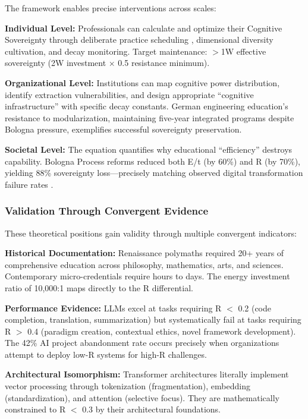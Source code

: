 The framework enables precise interventions across scales:

\textbf{Individual Level:} Professionals can calculate and optimize their Cognitive Sovereignty through deliberate practice scheduling \citep{ericsson1993}, dimensional diversity cultivation, and decay monitoring. Target maintenance: $>$1W effective sovereignty (2W investment $\times$ 0.5 resistance minimum).

\textbf{Organizational Level:} Institutions can map cognitive power distribution, identify extraction vulnerabilities, and design appropriate ``cognitive infrastructure'' with specific decay constants. German engineering education's resistance to modularization, maintaining five-year integrated programs despite Bologna pressure, exemplifies successful sovereignty preservation.

\textbf{Societal Level:} The equation quantifies why educational ``efficiency'' destroys capability. Bologna Process reforms reduced both E/t (by 60\%) and R (by 70\%), yielding 88\% sovereignty loss---precisely matching observed digital transformation failure rates \citep{bain2024}.

\subsubsection{Validation Through Convergent Evidence}

These theoretical positions gain validity through multiple convergent indicators:

\textbf{Historical Documentation:} Renaissance polymaths required 20+ years of comprehensive education across philosophy, mathematics, arts, and sciences. Contemporary micro-credentials require hours to days. The energy investment ratio of 10,000:1 maps directly to the R differential.

\textbf{Performance Evidence:} LLMs excel at tasks requiring R $<$ 0.2 (code completion, translation, summarization) but systematically fail at tasks requiring R $>$ 0.4 (paradigm creation, contextual ethics, novel framework development). The 42\% AI project abandonment rate occurs precisely when organizations attempt to deploy low-R systems for high-R challenges.

\textbf{Architectural Isomorphism:} Transformer architectures literally implement vector processing through tokenization (fragmentation), embedding (standardization), and attention (selective focus). They are mathematically constrained to R $<$ 0.3 by their architectural foundations.

